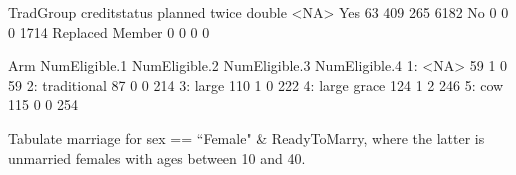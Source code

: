 \begin{Schunk}
\begin{Soutput}
                 TradGroup
creditstatus      planned twice double <NA>
  Yes                  63   409    265 6182
  No                    0     0      0 1714
  Replaced Member       0     0      0    0
\end{Soutput}
\begin{Soutput}
           Arm NumEligible.1 NumEligible.2 NumEligible.3 NumEligible.4
1:        <NA>            59             1             0            59
2: traditional            87             0             0           214
3:       large           110             1             0           222
4: large grace           124             1             2           246
5:         cow           115             0             0           254
\end{Soutput}
\end{Schunk}
Tabulate marriage for \textsf{sex} == ``Female" \& \textsf{ReadyToMarry}, where the latter is unmarried females with ages between 10 and 40.


